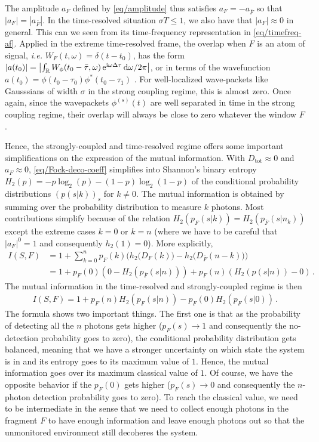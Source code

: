 The amplitude $a_F$ defined by
\cref{eq/amplitude} thus satisfies $a_F = -a_{\bar{F}}$ so that
$|a_F| = |a_{\bar{F}}|$. In the time-resolved situation 
$\sigma T \leq 1 $, we also have that $|a_F| \approx 0$ in general. 
This can we seen from its time-frequency representation in 
\cref{eq/timefreq-af}. Applied in the extreme time-resolved 
frame, the overlap when $F$ is an atom of signal,
\textit{i.e.} $W_F(t,\omega) = \delta(t-t_0)$, has the form 
$|a(t_0)| = \left| \int_{\mathbb{R}} W_{\phi}(t_0-\bar{\tau},\omega) 
\,\mathrm{e}^{\mathrm{i}\omega\Delta\tau}\, \mathrm{d} \omega/2\pi \right|$,
or in terms of the wavefunction
$a(t_0)  = \phi(t_0-\tau_0)\phi^*(t_0-\tau_1)$ .
For well-localized wave-packets like Gausssians of width $\sigma$ in
the strong coupling regime, this is almost zero. 
Once again, since the wavepackets $\phi^{(s)}(t)$ are well separated
in time in the strong coupling regime, their overlap will always be close
to zero whatever the window $F$.

Hence, the strongly-coupled and time-resolved regime offers some 
important simplifications on the expression of the mutual information.
With $D_{\text{tot}} \approx 0$ and $a_F \approx 0$, 
\cref{eq/Fock-deco-coeff} simplifies into Shannon's binary entropy
$H_2(p) = -p \log_2(p) -(1-p)\log_2(1-p)$ of the conditional probability 
distributions $(p(s|k))_s$ for $k \ne 0$. The mutual information is obtained
 by summing over the probability
distribution to measure $k$ photons. Most contributions simplify because
of the relation $H_2(p_F(s|k)) = H_2(p_{\overline{F}}(s|n_k))$ except
the extreme cases $k=0$ or $k=n$ (where we have to be careful that
$|a_F|^0 =1$ and consequently $h_2(1) =0$). More explicitly,
%
\begin{align*}
I(S,F) &= 1 + \sum_{k=0}^n p_F(k) 
\Big( 
	 h_2\big(D_F(k)\big)
	- h_2\big(D_{\overline{F}}(n-k)\big)
\Big) \\
& = 1 + p_F(0) ( 0 - H_2(p_{\overline{F}}(s|n))) + p_F(n) (H_2(p(s|n)) -0)
\,.
\end{align*}
The mutual information in the time-resolved and strongly-coupled regime
is then
%
\begin{align}
I(S,F) = 1 + p_F(n) H_2(p_F(s|n)) - p_F(0) H_2(p_F(s|0))
\,.
\label{eq/mutual-info-Fock-time-resol}
\end{align}
The formula shows two important things. The first one is that as the 
probability of detecting all the $n$ photons gets higher ($p_F(s) \to 1$
and consequently the no-detection probability goes to zero),
the conditional probability distribution gets balanced, meaning that we
have a stronger uncertainty on which state the system is in and its 
entropy goes to its maximum value of $1$. Hence, the mutual information 
goes over its maximum classical value of $1$. Of course, we have the opposite
behavior if the $p_F(0)$ gets higher  ($p_F(s) \to 0$
and consequently the $n$-photon detection probability goes to zero).
To reach the classical value, we need to be intermediate in the
sense that we need to collect enough photons in the fragment
$F$ to have enough information and leave enough photons out
so that the unmonitored environment still decoheres the system. 

